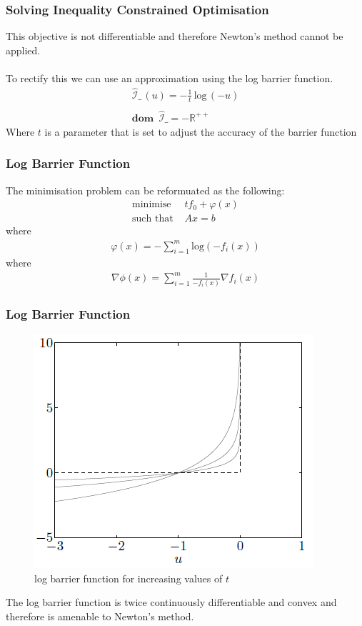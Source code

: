 \documentclass{beamer}
\def\rnum{\mathbb{R}}
\begin{document}
\begin{frame}
    \frametitle{Solving Inequality Constrained Optimisation}
    This objective is not differentiable and therefore Newton's method cannot be
    applied.
    \\~\\
    To rectify this we can use an approximation using the log barrier function.
    \begin{align*}
        \hat{\mathcal{I}}\_\, (u) = -\frac{1}{t}\, \text{log}\,(-u) \\\\
        \mathbf{dom} \,\,\,\hat{\mathcal{I}}\_ = -\rnum^{++}
    \end{align*}
    Where $t$ is a parameter that is set to adjust the accuracy of the barrier
    function
\end{frame}

\begin{frame}
    \frametitle{Log Barrier Function}
    The minimisation problem can be reformuated as the following:
    \begin{align*}
        \text{minimise } \, &t f_{0} +
        \varphi(x)\\
        \text{such that } & Ax =b
    \end{align*}
    where
    \begin{align*}
        \varphi(x) = - \sum\limits_{i=1}^{m}\text{log}(-f_{i}(x))
    \end{align*}
    where
    \begin{align*}
        \nabla \phi(x) = \sum\limits_{i=1}^{m}\frac{1}{-f_{i}(x)}\nabla f_{i}(x)
    \end{align*}
\end{frame}

\begin{frame}
    \frametitle{Log Barrier Function}
    \begin{figure}[t]
        \centering
        \includegraphics[scale=0.6]{barrier_function}
        \caption{log barrier function for increasing values of $t$}
        \label{fig:logbar}
    \end{figure}
    The log barrier function is twice continuously differentiable and convex
    and therefore is amenable to Newton's method.
\end{frame}
\end{document}
